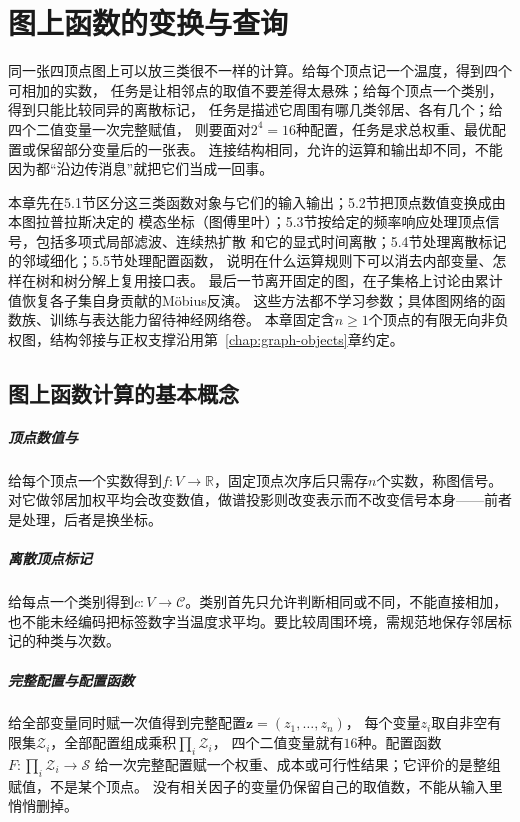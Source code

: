 \chapter{图上函数的变换与查询}
\label{chap:graph-functions}

同一张四顶点图上可以放三类很不一样的计算。给每个顶点记一个温度，得到四个可相加的实数，
任务是让相邻点的取值不要差得太悬殊；给每个顶点一个类别，得到只能比较同异的离散标记，
任务是描述它周围有哪几类邻居、各有几个；给四个二值变量一次完整赋值，
则要面对$2^4=16$种配置，任务是求总权重、最优配置或保留部分变量后的一张表。
连接结构相同，允许的运算和输出却不同，不能因为都“沿边传消息”就把它们当成一回事。

本章先在5.1节区分这三类函数对象与它们的输入输出；5.2节把顶点数值变换成由本图拉普拉斯决定的
模态坐标（图傅里叶）；5.3节按给定的频率响应处理顶点信号，包括多项式局部滤波、连续热扩散
和它的显式时间离散；5.4节处理离散标记的邻域细化；5.5节处理配置函数，
说明在什么运算规则下可以消去内部变量、怎样在树和树分解上复用接口表。
最后一节离开固定的图，在子集格上讨论由累计值恢复各子集自身贡献的Möbius反演。
这些方法都不学习参数；具体图网络的函数族、训练与表达能力留待神经网络卷。
本章固定含$n\geq1$个顶点的有限无向非负权图，结构邻接与正权支撑沿用第~\ref{chap:graph-objects}章约定。

\section{图上函数计算的基本概念}

\paragraph{顶点数值与}
给每个顶点一个实数得到$f:V\to\mathbb R$，固定顶点次序后只需存$n$个实数，称图信号。
对它做邻居加权平均会改变数值，做谱投影则改变表示而不改变信号本身——前者是处理，后者是换坐标。

\paragraph{离散顶点标记}
给每点一个类别得到$c:V\to\mathcal C$。类别首先只允许判断相同或不同，不能直接相加，
也不能未经编码把标签数字当温度求平均。要比较周围环境，需规范地保存邻居标记的种类与次数。

\paragraph{完整配置与配置函数}
给全部变量同时赋一次值得到完整配置$\bm z=(z_1,\ldots,z_n)$，
每个变量$z_i$取自非空有限集$\mathcal Z_i$，全部配置组成乘积$\prod_i\mathcal Z_i$，
四个二值变量就有$16$种。配置函数$F:\prod_i\mathcal Z_i\to\mathcal S$
给一次完整配置赋一个权重、成本或可行性结果；它评价的是整组赋值，不是某个顶点。
没有相关因子的变量仍保留自己的取值数，不能从输入里悄悄删掉。

